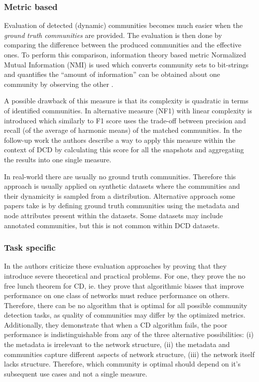\documentclass[
acmsmall,
nonacm,
screen,
acmthm]{../../scripts/pandoc/templates/acmart}
\begin{document}
\hypertarget{metric-based}{%
\subsubsection{Metric based}\label{metric-based}}

Evaluation of detected (dynamic) communities becomes much easier when
the \emph{ground truth communities} are provided. The evaluation is then
done by comparing the difference between the produced communities and
the effective ones. To perform this comparison, information theory based
metric Normalized Mutual Information (NMI) is used which converts
community sets to bit-strings and quantifies the ``amount of
information'' can be obtained about one community by observing the other
\citep{lancichinettiDetectingOverlappingHierarchical2009}.

A possible drawback of this measure is that its complexity is quadratic
in terms of identified communities. In
\citep{rossettiNovelApproachEvaluate2016} alternative measure (NF1) with
linear complexity is introduced which similarly to F1 score uses the
trade-off between precision and recall (of the average of harmonic
means) of the matched communities. In the follow-up work
\citep{rossettiANGELEfficientEffective2020} the authors describe a way
to apply this measure within the context of DCD by calculating this
score for all the snapshots and aggregating the results into one single
measure.

In real-world there are usually no ground truth communities. Therefore
this approach is usually applied on synthetic datasets where the
communities and their dynamicity is sampled from a distribution.
Alternative approach some papers take is by defining ground truth
communities using the metadata and node attributes present within the
datasets. Some datasets may include annotated communities, but this is
not common within DCD datasets.

\hypertarget{task-specific}{%
\subsubsection{Task specific}\label{task-specific}}

In \citep{peelGroundTruthMetadata2017} the authors criticize these
evaluation approaches by proving that they introduce severe theoretical
and practical problems. For one, they prove the no free lunch theorem
for CD, ie. they prove that algorithmic biases that improve performance
on one class of networks must reduce performance on others. Therefore,
there can be no algorithm that is optimal for all possible community
detection tasks, as quality of communities may differ by the optimized
metrics. Additionally, they demonstrate that when a CD algorithm fails,
the poor performance is indistinguishable from any of the three
alternative possibilities: (i) the metadata is irrelevant to the network
structure, (ii) the metadata and communities capture different aspects
of network structure, (iii) the network itself lacks structure.
Therefore, which community is optimal should depend on it's subsequent
use cases and not a single measure.
\end{document}
